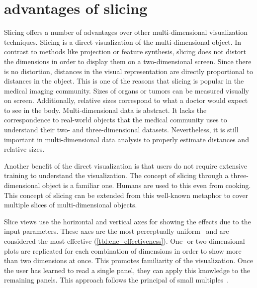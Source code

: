 \section{advantages of slicing}
\label{sec:slicing-advantages}

Slicing offers a number of advantages over other multi-dimensional
visualization techniques. Slicing is a direct visualization of the
multi-dimensional object. In contrast to methods like projection or feature
synthesis, slicing does not distort the dimensions in order to display them on
a two-dimensional screen. Since there is no distortion, distances in the visual
representation are directly proportional to distances in the object. This is
one of the reasons that slicing is popular in the medical imaging community.
Sizes of organs or tumors can be measured visually on screen. Additionally,
relative sizes correspond to what a doctor would expect to see in the body.
Multi-dimensional data is abstract. It lacks the correspondence to real-world
objects that the medical community uses to understand their two- and
three-dimensional datasets. Nevertheless, it is still important in
multi-dimensional data analysis to properly estimate distances and relative
sizes. 

Another benefit of the direct visualization is that users do not require
extensive training to understand the visualization. The concept of slicing
through a three-dimensional object is a familiar one. Humans are used to this
even from cooking. This concept of slicing can be extended from this 
well-known metaphor to cover multiple slices of multi-dimensional objects.

Slice views use the horizontal and vertical axes for showing the effects due to
the input parameters. These axes are the most perceptually
uniform~\cite{Stevens:1957} and are considered the most effective
(\autoref{tbl:enc_effectiveness}). One- or two-dimensional
plots are replicated for each combination of dimensions in order to show more
than two dimensions at once. This promotes familiarity of the visualization.
Once the user has learned to read a single panel, they can apply this knowledge
to the remaining panels. This approach follows the principal of small
multiples~\cite{Archambault:2011}. 

